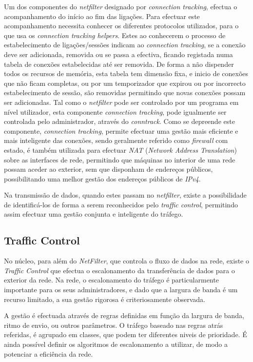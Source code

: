Um dos componentes do \textit{netfilter} designado por \textit{connection tracking}, efectua o acompanhamento do início ao fim das ligações.
Para efectuar este acompanhamento necessita conhecer os diferentes protocolos utilizados, para o que usa os \textit{connection tracking helpers}.
Estes ao conhecerem o processo de estabelecimento de ligações/sessões indicam ao \textit{connection tracking}, se a conexão deve ser adicionada, removida ou se passa a efectiva, ficando registada numa tabela de conexões estabelecidas até ser removida.
De forma a não dispender todos os recursos de memória, esta tabela tem dimensão fixa, e inicio de conexões que não ficam completas, ou por um temporizador que expirou ou por incorrecto estabelecimento de sessão, são removidas permitindo que novas conexões possam ser adicionadas.
Tal como o \textit{netfilter} pode ser controlado por um programa em nível utilizador, esta componente \textit{connection tracking}, pode igualmente ser controlada pelo administrador, através do \textit{conntrack}.
Como se depreende este componente, \textit{connection tracking}, permite efectuar uma gestão mais eficiente e mais inteligente das conexões, sendo geralmente referido como \textit{firewall} com estado, é também utilizada para efectuar \textit{NAT} (\textit{Network Address Translation}) sobre as interfaces de rede, permitindo que máquinas no interior de uma rede possam aceder ao exterior, sem que disponham de endereços públicos, possibilitando uma melhor gestão dos endereços públicos de \textit{IPv4}.

Na transmissão de dados, quando estes passam no \textit{netfilter}, existe a possibilidade de identificá-los de forma a serem reconhecidos pelo \textit{traffic control}, permitindo assim efectuar uma gestão conjunta e inteligente do tráfego.

\subsection{Traffic Control}
\label{sub:traffic_control}


No núcleo, para além do \textit{NetFilter}, que controla o fluxo de dados na rede, existe o \textit{Traffic Control} que efectua o escalonamento da transferência de dados para o exterior da rede.
Na rede, o escalonamento do tráfego é particularmente importante para os seus administradores, e dado que a largura de banda é um recurso limitado, a sua gestão rigorosa é criteriosamente observada.

A gestão é efectuada através de regras definidas em função da largura de banda, ritmo de envio, ou outros parâmetros.
O tráfego baseado nas regras atrás referidas, é agrupado em classes, que podem ter diferentes niveis de prioridade.
É ainda possível definir os algoritmos de escalonamento a utilizar, de modo a potenciar a eficiência da rede.

